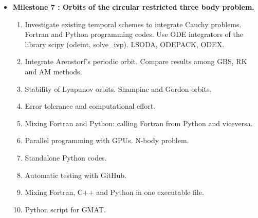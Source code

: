 \documentclass[12pt, a4paper]{article}
\begin{document}
\begin{itemize}
\item {\bf Milestone 7 : Orbits of the circular restricted three body 
    problem.}    

 \begin{enumerate} 
    
     \item Investigate existing temporal schemes to integrate Cauchy problems. 
     Fortran and Python programming codes.  
     Use ODE integrators of the library scipy (odeint, solve\_ivp). 
     LSODA, ODEPACK, ODEX.  
     \item Integrate Arenstorf's periodic orbit. Compare results among GBS, RK and 
     AM methods.  
     \item Stability of Lyapunov orbits.  Shampine and Gordon orbits.
     \item Error tolerance and computational effort. 
     \item Mixing Fortran and Python: calling Fortran from Python and viceversa.
     \item Parallel programming with GPUs. N-body problem. 
     \item Standalone Python codes.  
     \item Automatic testing with GitHub.
     \item Mixing Fortran, C++ and Python in one executable file.
     \item Python script for GMAT. 
 \end{enumerate}






 
 
\end{itemize}
\end{document}
